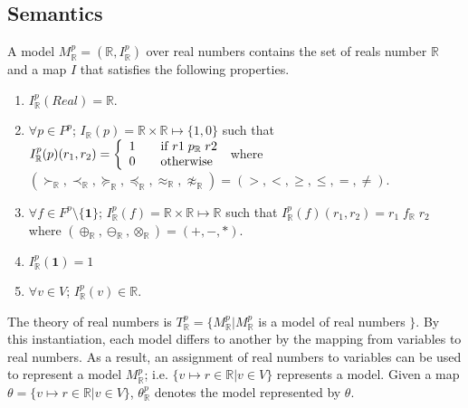 \subsection{Semantics}
A model $M^p_{\mathbb{R}} = (\mathbb{R}, I^p_{\mathbb{R}})$ over real numbers contains the set of reals number $\mathbb{R}$ and a map $I$ that satisfies the following properties.
\begin{enumerate}
\item $I^p_{\mathbb{R}}(Real) = \mathbb{R}$.
\item $\forall p \in P^p$; $I_{\mathbb{R}}(p) = \mathbb{R} \times \mathbb{R} \mapsto \{1, 0\}$ such that $ I_\mathbb{R}^p(p)(r_1, r_2) = \left\{ 
  \begin{array}{c l}
    1 & \quad \text{if } r1 \; p_{\mathbb{R}} \; r2\\
    0 & \quad \text{otherwise }\\
  \end{array} \right.$ where $(\succ_\mathbb{R}, \prec_{\mathbb{R}},\succeq_\mathbb{R},\preceq_{\mathbb{R}}, \approx_\mathbb{R}, \not\approx_\mathbb{R}) = (>, <, \ge, \le, =, \neq)$.
\item $\forall f \in F^p \setminus \{\mathbf{1}\}$; $I^p_{\mathbb{R}}(f) = \mathbb{R} \times \mathbb{R} \mapsto \mathbb{R}$ such that $I^p_{\mathbb{R}}(f)(r_1, r_2)  = r_1 \; f_{\mathbb{R}} \; r_2$ where $(\oplus_{\mathbb{R}}, \ominus_{\mathbb{R}}, \otimes_{\mathbb{R}}) = (+, -, *)$.
\item $I^p_\mathbb{R}(\mathbf{1}) = 1$
\item $\forall v \in V$; $I^p_{\mathbb{R}}(v) \in \mathbb{R}$.
\end{enumerate}
The theory of real numbers is $T^p_{\mathbb{R}} = \{M^p_{\mathbb{R}} | M^p_{\mathbb{R}}$ is a model of real numbers $\}$.
By this instantiation, each model differs to another by the mapping from variables to real numbers. As a result, an assignment of real numbers to variables can be used to represent a model $M^p_{\mathbb{R}}$; i.e. $\{v \mapsto r \in \mathbb{R} | v \in V\}$ represents a model. Given a map $\theta = \{v \mapsto r \in \mathbb{R}| v \in V \}$, $\theta^p_\mathbb{R}$ denotes the model represented by $\theta$.

